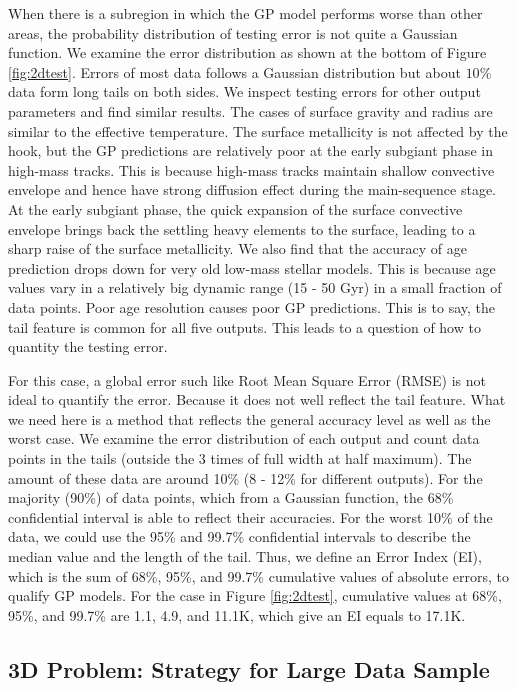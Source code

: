 When there is a subregion in which the GP model performs worse than other areas, the probability distribution of testing error is not quite a  Gaussian function. We examine the error distribution as shown at the bottom of Figure \ref{fig:2dtest}. Errors of most data follows a Gaussian distribution but about $10\%$ data form long tails on both sides. 
%
We inspect testing errors for other output parameters and find similar results. 
The cases of surface gravity and radius are similar to the effective temperature. The surface metallicity is not affected by the hook, but the GP predictions are relatively poor at the early subgiant phase in high-mass tracks. This is because high-mass tracks maintain shallow convective envelope and hence have strong diffusion effect during the main-sequence stage. At the early subgiant phase, the quick expansion of the surface convective envelope brings back the settling heavy elements to the surface, leading to a sharp raise of the surface metallicity. 
%
We also find that the accuracy of age prediction drops down for very old low-mass stellar models. This is because age values vary in a relatively big dynamic range (15 - 50 Gyr) in a small fraction of data points. Poor age resolution causes poor GP predictions.        
This is to say, the tail feature is common for all five outputs. This leads to a question of how to quantity the testing error.

For this case, a global error such like Root Mean Square Error (RMSE) is not ideal to quantify the error. Because it does not well reflect the tail feature. What we need here is a method that reflects the general accuracy level as well as the worst case. 
%
We examine the error distribution of each output and count data points in the tails (outside the 3 times of full width at half maximum). The amount of these data are around 10\% (8 - 12\% for different outputs). 
%
For the majority (90\%) of data points, which from a Gaussian function, the 68\% confidential interval is able to reflect their accuracies. For the worst 10\% of the data, we could use the 95\% and 99.7\% confidential intervals to describe the median value and the length of the tail. Thus, we define an Error Index (EI), which is the sum of 68\%, 95\%, and 99.7\% cumulative values of absolute errors, to qualify GP models. For the case in Figure \ref{fig:2dtest}, cumulative values at 68\%, 95\%, and 99.7\% are 1.1, 4.9, and 11.1K, which give an EI equals to 17.1K. 

\subsection{3D Problem: Strategy for Large Data Sample}

